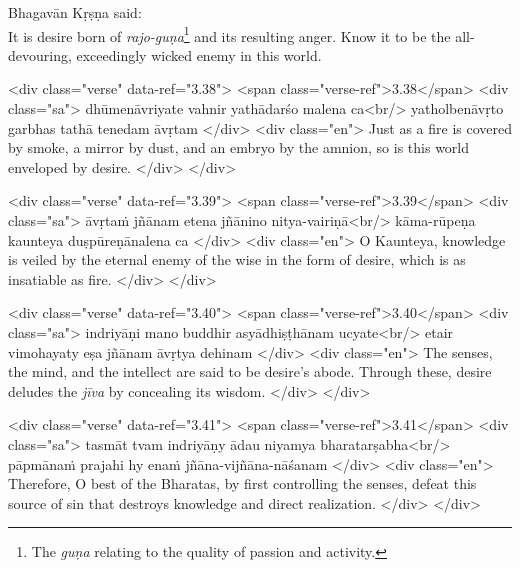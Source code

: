 {\hspace*{1em}Bhagavān Kṛṣṇa said: \\
It is desire born of \textit{rajo-guṇa}\footnote{The \textit{guṇa} relating to the quality of passion and activity.} and its resulting anger. Know it to be the all-devouring, exceedingly wicked enemy in this world.} 


\begin{html}
<div class="verse" data-ref="3.38">
  <span class="verse-ref">3.38</span>
  <div class="sa">
    dhūmenāvriyate vahnir yathādarśo malena ca<br/>
    yatholbenāvṛto garbhas tathā tenedam āvṛtam
  </div>
  <div class="en">
    Just as a fire is covered by smoke, a mirror by dust, and an embryo by the amnion, so is this world enveloped by desire.
  </div>
</div>
\end{html}



\begin{html}
<div class="verse" data-ref="3.39">
  <span class="verse-ref">3.39</span>
  <div class="sa">
    āvṛtaṁ jñānam etena jñānino nitya-vairiṇā<br/>
    kāma-rūpeṇa kaunteya duṣpūreṇānalena ca
  </div>
  <div class="en">
    O Kaunteya, knowledge is veiled by the eternal enemy of the wise in the form of desire, which is as insatiable as fire.
  </div>
</div>
\end{html}



\begin{html}
<div class="verse" data-ref="3.40">
  <span class="verse-ref">3.40</span>
  <div class="sa">
    indriyāṇi mano buddhir asyādhiṣṭhānam ucyate<br/>
    etair vimohayaty eṣa jñānam āvṛtya dehinam
  </div>
  <div class="en">
    The senses, the mind, and the intellect are said to be desire’s abode. Through these, desire deludes the \textit{jīva} by concealing its wisdom.
  </div>
</div>
\end{html}



\begin{html}
<div class="verse" data-ref="3.41">
  <span class="verse-ref">3.41</span>
  <div class="sa">
    tasmāt tvam indriyāṇy ādau niyamya bharatarṣabha<br/>
    pāpmānaṁ prajahi hy enaṁ jñāna-vijñāna-nāśanam
  </div>
  <div class="en">
    Therefore, O best of the Bharatas, by first controlling the senses, defeat this source of sin that destroys knowledge and direct realization.
  </div>
</div>
\end{html}



